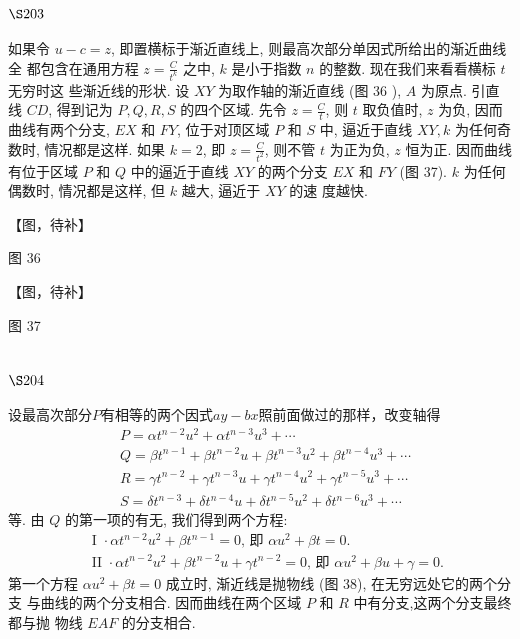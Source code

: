 \section{$\S 203$}

如果令 $u-c=z$, 即置横标于渐近直线上, 则最高次部分单因式所给出的渐近曲线全 都包含在通用方程 $z=\frac{C}{t^{k}}$ 之中, $k$ 是小于指数 $n$ 的整数. 现在我们来看看横标 $t$ 无穷时这 些渐近线的形状. 设 $X Y$ 为取作轴的渐近直线 (图 36 ), $A$ 为原点. 引直线 $C D$, 得到记为 $P, Q, R, S$ 的四个区域. 先令 $z=\frac{C}{t}$, 则 $t$ 取负值时, $z$ 为负, 因而曲线有两个分支, $E X$ 和 $F Y$, 位于对顶区域 $P$ 和 $S$ 中, 逼近于直线 $X Y, k$ 为任何奇数时, 情况都是这样. 如果 $k=2$, 即 $z=\frac{C}{t^{2}}$, 则不管 $t$ 为正为负, $z$ 恒为正. 因而曲线有位于区域 $P$ 和 $Q$ 中的逼近于直线 $X Y$ 的两个分支 $E X$ 和 $F Y$ (图 37). $k$ 为任何偶数时, 情况都是这样, 但 $k$ 越大, 逼近于 $X Y$ 的速 度越快.


【图，待补】

图 36


【图，待补】

图 37 

\section{$\S 204$}

设最高次部分$P$有相等的两个因式$ay-bx$照前面做过的那样，改变轴得
\[
\begin{aligned}
& P=\alpha t^{n-2} u^{2}+\alpha t^{n-3} u^{3}+\cdots \\
& Q=\beta t^{n-1}+\beta t^{n-2} u+\beta t^{n-3} u^{2}+\beta t^{n-4} u^{3}+\cdots \\
& R=\gamma t^{n-2}+\gamma t^{n-3} u+\gamma t^{n-4} u^{2}+\gamma t^{n-5} u^{3}+\cdots \\
& S=\delta t^{n-3}+\delta t^{n-4} u+\delta t^{n-5} u^{2}+\delta t^{n-6} u^{3}+\cdots
\end{aligned}
\]
等. 由 $Q$ 的第一项的有无, 我们得到两个方程:
\[
\begin{aligned}
& \text { I } \cdot \alpha t^{n-2} u^{2}+\beta t^{n-1}=0 \text {, 即 } \alpha u^{2}+\beta t=0 . \\
& \text { II } \cdot \alpha t^{n-2} u^{2}+\beta t^{n-2} u+\gamma t^{n-2}=0 \text {, 即 } \alpha u^{2}+\beta u+\gamma=0 .
\end{aligned}
\]
第一个方程 $\alpha u^{2}+\beta t=0$ 成立时, 渐近线是抛物线 (图 38), 在无穷远处它的两个分支 与曲线的两个分支相合. 因而曲线在两个区域 $P$ 和 $R$ 中有分支,这两个分支最终都与抛 物线 $E A F$ 的分支相合.


